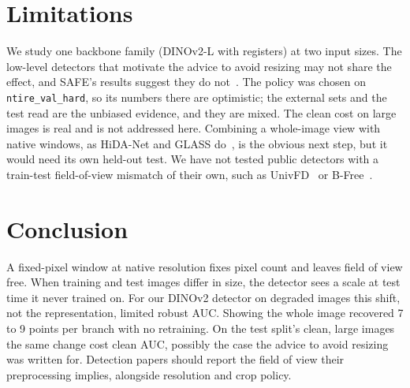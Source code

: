 \documentclass[10pt,twocolumn,letterpaper]{article}
\begin{document}
\section{Limitations}

We study one backbone family (DINOv2-L with registers) at two input sizes. The
low-level detectors that motivate the advice to avoid resizing may not share
the effect, and SAFE's results suggest they do not~\cite{li2025safe}. The
policy was chosen on \texttt{ntire\_val\_hard}, so its numbers there are
optimistic; the external sets and the test read are the unbiased evidence,
and they are mixed. The clean cost on large images is real and is not
addressed here. Combining a whole-image view with native windows, as
HiDA-Net and GLASS do~\cite{mu2026hidanet,han2026glass}, is the obvious next
step, but it would need its own held-out test. We have not tested public
detectors with a train-test field-of-view mismatch of their own, such as
UnivFD~\cite{ojha2023univfd} or B-Free~\cite{guillaro2025bfree}.

\section{Conclusion}

A fixed-pixel window at native resolution fixes pixel count and leaves field
of view free. When training and test images differ in size, the detector sees
a scale at test time it never trained on. For our DINOv2 detector on degraded
images this shift, not the representation, limited robust AUC. Showing the
whole image recovered 7 to 9 points per branch with no retraining. On the
test split's clean, large images the same change cost clean AUC, possibly the
case the advice to avoid resizing was written for. Detection papers should report the field of
view their preprocessing implies, alongside resolution and crop policy.

{\small


}
\end{document}
